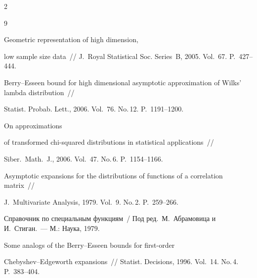 \begin{multicols}{2}
{\small\frenchspacing

{%


\begin{thebibliography}{9}





Geometric representation of high dimension,

low sample size data~// J.~Royal Statistical Soc. Series~B,  2005. Vol.~67. P.~427--444.





Berry--Esseen bound for high dimensional asymptotic approximation of Wilks' lambda distribution~// 

Statist. Probab. Lett.,  2006. Vol.~76.  No.\,12. P.~1191--1200.





On approximations

of transformed chi-squared distributions in statistical applications~//

 Siber.\ Math.\ J., 2006. Vol.~47. No.\,6. P.~1154--1166.





Asymptotic expansions for the distributions of functions of a correlation matrix~//

J.\ Multivariate Analysis, 1979. Vol.~9. No.\,2. P.~259--266.






Справочник по специальным функциям~/ Под ред.\ М.~Абрамовица и И.~Стиган.~--- М.: Наука, 1979.



\label{end\stat}





Some analogs of the Berry--Esseen bounds for first-order

Chebyshev--Edgeworth expansions~// Statist. Decisions, 1996. Vol.~14. No.\,4. P.~383--404.

 \end{thebibliography}

}

}



\end{multicols}

